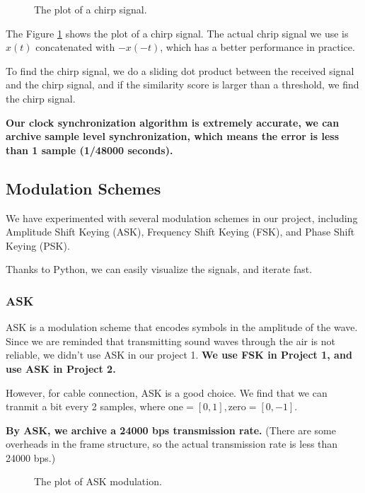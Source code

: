 \documentclass{article}
\begin{document}
\begin{figure}[H]
    \noindent\makebox[\textwidth]{}
    \caption{The plot of a chirp signal.}
    \label{fig:chirp}
\end{figure}

The Figure \ref{fig:chirp} shows the plot of a chirp signal.
The actual chrip signal we use is \(x(t)\) concatenated with \(-x(-t)\), which has a better performance in practice.

To find the chirp signal, we do a sliding dot product between the received signal and the chirp signal, and if the similarity score is larger than a threshold, we find the chirp signal.

\textbf{Our clock synchronization algorithm is extremely accurate, we can archive sample level synchronization, which means the error is less than 1 sample (1/48000 seconds).}

\subsection{Modulation Schemes}

We have experimented with several modulation schemes in our project, including Amplitude Shift Keying (ASK), Frequency Shift Keying (FSK), and Phase Shift Keying (PSK).

Thanks to Python, we can easily visualize the signals, and iterate fast.

\subsubsection{ASK}

ASK is a modulation scheme that encodes symbols in the amplitude of the wave.
Since we are reminded that transmitting sound waves through the air is not reliable, we didn't use ASK in our project 1. \textbf{We use FSK in Project 1, and use ASK in Project 2.}

However, for cable connection, ASK is a good choice.
We find that we can tranmit a bit every 2 samples, where \(\text{one} = [0,1], \text{zero}=[0,-1]\).

\textbf{By ASK, we archive a 24000 bps transmission rate.} (There are some overheads in the frame structure, so the actual transmission rate is less than 24000 bps.)

\begin{figure}[H]
    \noindent\makebox[\textwidth]{}
    \caption{The plot of ASK modulation.}
    \label{fig:ask}
\end{figure}
\end{document}
